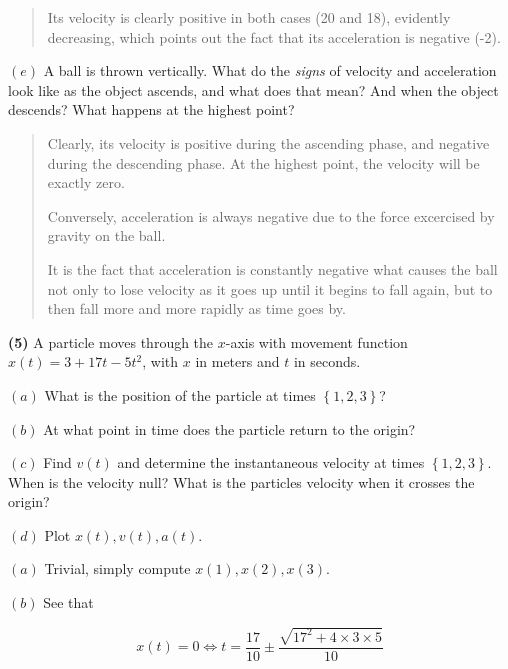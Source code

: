 \documentclass[12pt]{article}
\theoremstyle{definition}
\begin{document}
\small
\begin{quote}

Its velocity is clearly positive in both cases (20 and 18), evidently
decreasing, which points out the fact that its acceleration is negative (-2).

\end{quote}
\normalsize

$(e)$ A ball is thrown vertically. What do the \textit{signs} of velocity and
acceleration look like as the object ascends, and what does that mean? And
when the object descends? What happens at the highest point?


\small
\begin{quote}

Clearly, its velocity is positive during the ascending phase, and negative
during the descending phase. At the highest point, the velocity will be exactly
zero. 

Conversely, acceleration is always negative due to the force excercised by
gravity on the ball. 

It is the fact that acceleration is constantly negative what causes the ball not
only to lose velocity as it goes up until it begins to fall again, but to then
fall more and more rapidly as time goes by.


\end{quote}
\normalsize

\pagebreak 

\begin{shaded}
    \textbf{(5)} A particle moves through the $x$-axis with movement function 
    $x(t) = 3 + 17t - 5t^2$, with $x$ in meters and $t$ in seconds. 

    $(a)$ What is the position of the particle at times $\left\{ 1, 2, 3
    \right\} $?

    $(b)$ At what point in time does the particle return to the origin? 

    $(c)$ Find $v(t)$ and determine the instantaneous velocity at times $\left\{
    1, 2, 3\right\} $. When is the velocity null? What is the particles velocity
    when it crosses the origin? 

    $(d)$ Plot $x(t), v(t), a(t)$.
\end{shaded}


$(a)$ Trivial, simply compute $x(1), x(2), x(3)$.

$(b)$ See that

\begin{equation*}
    x(t) = 0 \iff t = \frac{17}{10} \pm \frac{ \sqrt{17^2 + 4\times 3 \times 5}
    }{10}
\end{equation*}
\end{document}
